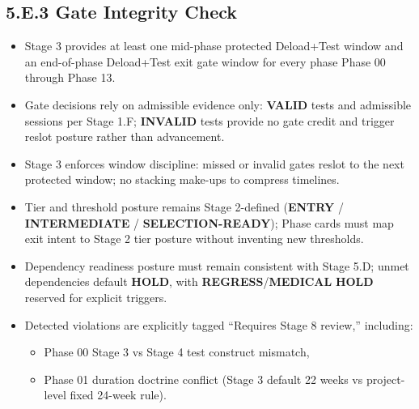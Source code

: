 \documentclass[10pt]{article}
\begin{document}
\subsection*{5.E.3 Gate Integrity Check}
{}

\begin{itemize}
\item Stage 3 provides at least one mid-phase protected Deload+Test window and an end-of-phase Deload+Test exit gate window for every phase Phase 00 through Phase 13.
\item Gate decisions rely on admissible evidence only: \textbf{VALID} tests and admissible sessions per Stage 1.F; \textbf{INVALID} tests provide no gate credit and trigger reslot posture rather than advancement.
\item Stage 3 enforces window discipline: missed or invalid gates reslot to the next protected window; no stacking make-ups to compress timelines.
\item Tier and threshold posture remains Stage 2-defined (\textbf{ENTRY} / \textbf{INTERMEDIATE} / \textbf{SELECTION-READY}); Phase cards must map exit intent to Stage 2 tier posture without inventing new thresholds.
\item Dependency readiness posture must remain consistent with Stage 5.D; unmet dependencies default \textbf{HOLD}, with \textbf{REGRESS}/\textbf{MEDICAL} \textbf{HOLD} reserved for explicit triggers.
\item Detected violations are explicitly tagged “Requires Stage 8 review,” including:
  \begin{itemize}
  \item Phase 00 Stage 3 vs Stage 4 test construct mismatch,
  \item Phase 01 duration doctrine conflict (Stage 3 default 22 weeks vs project-level fixed 24-week rule).
  \end{itemize}
\end{itemize}
\end{document}
